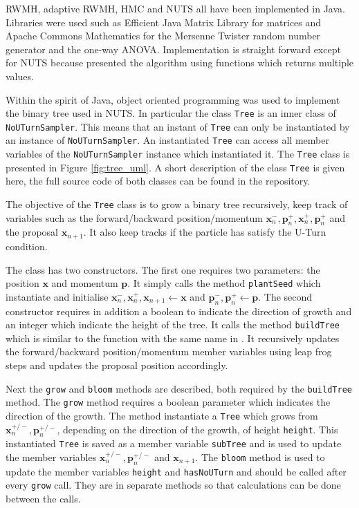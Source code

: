 \documentclass[10pt]{proc}
\newcommand{\vect}[1]{\mathbf{#1}}
\begin{document}
RWMH, adaptive RWMH, HMC and NUTS all have been implemented in Java. Libraries were used such as Efficient Java Matrix Library \citep{abeles2018ejml} for matrices and Apache Commons Mathematics \citep{apache2016math} for the Mersenne Twister random number generator \citep{matsumoto1998mersenne} and the one-way ANOVA. Implementation is straight forward except for NUTS because \cite{hoffman2014no} presented the algorithm using functions which returns multiple values.

Within the spirit of Java, object oriented programming was used to implement the binary tree used in NUTS. In particular the class \texttt{Tree} is an inner class of \texttt{NoUTurnSampler}. This means that an instant of \texttt{Tree} can only be instantiated by an instance of \texttt{NoUTurnSampler}. An instantiated \texttt{Tree} can access all member variables of the \texttt{NoUTurnSampler} instance which instantiated it. The \texttt{Tree} class is presented in Figure \ref{fig:tree_uml}. A short description of the class \texttt{Tree} is given here, the full source code of both classes can be found in the repository.

The objective of the \texttt{Tree} class is to grow a binary tree recursively, keep track of variables such as the forward/backward position/momentum $\vect{x}_n^-,\vect{p}_n^+,\vect{x}_n^+,\vect{p}_n^+$ and the proposal $\vect{x}_{n+1}$. It also keep tracks if the particle has satisfy the U-Turn condition.

The class has two constructors. The first one requires two parameters: the position $\vect{x}$ and momentum $\vect{p}$. It simply calls the method \texttt{plantSeed} which instantiate and initialise $\vect{x}_n^-, \vect{x}_n^+, \vect{x}_{n+1} \leftarrow \vect{x}$ and $\vect{p}_n^-, \vect{p}_n^+ \leftarrow \vect{p}$. The second constructor requires in addition a boolean to indicate the direction of growth and an integer which indicate the height of the tree. It calls the method \texttt{buildTree} which is similar to the function with the same name in \cite{hoffman2014no}. It recursively updates the forward/backward position/momentum member variables using leap frog steps and updates the proposal position accordingly.

Next the \texttt{grow} and \texttt{bloom} methods are described, both required by the \texttt{buildTree} method. The \texttt{grow} method requires a boolean parameter which indicates the direction of the growth. The method instantiate a \texttt{Tree} which grows from $\vect{x}_n^{+/-}, \vect{p}_n^{+/-}$, depending on the direction of the growth, of height \texttt{height}. This instantiated \texttt{Tree} is saved as a member variable \texttt{subTree} and is used to update the member variables  $\vect{x}_n^{+/-}, \vect{p}_n^{+/-}$ and $\vect{x}_{n+1}$. The \texttt{bloom} method is used to update the member variables \texttt{height} and \texttt{hasNoUTurn} and should be called after every \texttt{grow} call. They are in separate methods so that calculations can be done between the calls.
\end{document}
